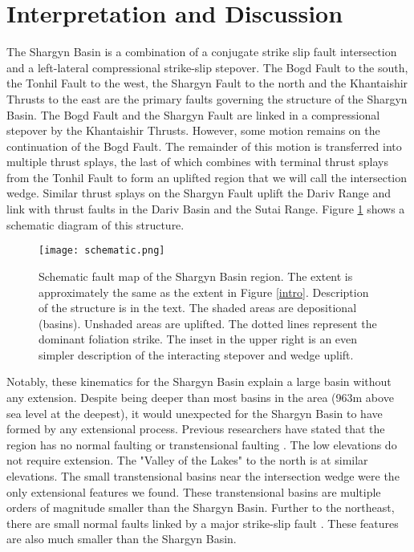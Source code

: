 \section{Interpretation and Discussion}
	The Shargyn Basin is a combination of a conjugate strike slip fault intersection and a left-lateral compressional strike-slip stepover. The Bogd Fault to the south, the Tonhil Fault to the west, the Shargyn Fault to the north and the Khantaishir Thrusts to the east are the primary faults governing the structure of the Shargyn Basin. The Bogd Fault and the Shargyn Fault are linked in a compressional stepover by the Khantaishir Thrusts. However, some motion remains on the continuation of the Bogd Fault. The remainder of this motion is transferred into multiple thrust splays, the last of which combines with terminal thrust splays from the Tonhil Fault to form an uplifted region that we will call the intersection wedge. Similar thrust splays on the Shargyn Fault uplift the Dariv Range and link with thrust faults in the Dariv Basin and the Sutai Range. Figure \ref{schematic} shows a schematic diagram of this structure.

\begin{figure}[p!]
  \centering
  \texttt{[image: schematic.png]}
  \caption{Schematic fault map of the Shargyn Basin region. The extent is approximately the same as the extent in Figure \ref{intro}. Description of the structure is in the text. The shaded areas are depositional (basins). Unshaded areas are uplifted. The dotted lines represent the dominant foliation strike. The inset in the upper right is an even simpler description of the interacting stepover and wedge uplift.}
  \label{schematic}
\end{figure}

	Notably, these kinematics for the Shargyn Basin explain a large basin without any extension. Despite being deeper than most basins in the area (963m above sea level at the deepest), it would unexpected for the Shargyn Basin to have formed by any extensional process. Previous researchers have stated that the region has no normal faulting or transtensional faulting \citep{Cunningham2005a}. The low elevations do not require extension. The "Valley of the Lakes" to the north is at similar elevations. The small transtensional basins near the intersection wedge were the only extensional features we found. These transtensional basins are multiple orders of magnitude smaller than the Shargyn Basin. Further to the northeast, there are small normal faults linked by a major strike-slip fault \citep{Walker2006}. These features are also much smaller than the Shargyn Basin.

